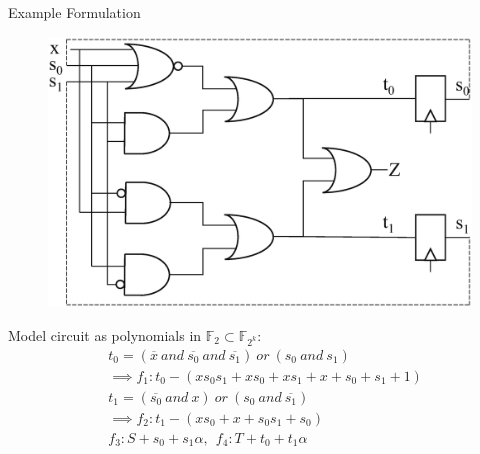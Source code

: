 \documentclass[xcolor=dvipsnames]{beamer}
\begin{document}
\begin{frame}{\large {Example Formulation}}
\vspace{-0.1in}
\begin{figure}[hbt]
\centerline{
\includegraphics[scale=0.25]{fsm_fig.eps}
}
\end{figure}
\vspace{-0.4in}
Model circuit as polynomials in $\mathbb{F}_2 \subset \mathbb{F}_{2^k}$:
\begin{align*}
&t_0 = (\overline{x}\ and\ \overline{s_0}\ and\ \overline{s_1})\ or\ (s_0\ and\ s_1)\\
&\implies f_1: t_0- (xs_0s_1+xs_0+xs_1+x+s_0+s_1+1)\\
&t_1 = (\overline{s_0}\ and\ x)\ or\ (s_0\ and\ \overline{s_1})~~~~\\
&\implies f_2: t_1 - (xs_0+x+s_0s_1+s_0)\\
&f_3: S + s_0 + s_1\alpha, ~~f_4:T + t_0 + t_1\alpha
\end{align*}
\end{frame}
\end{document}
